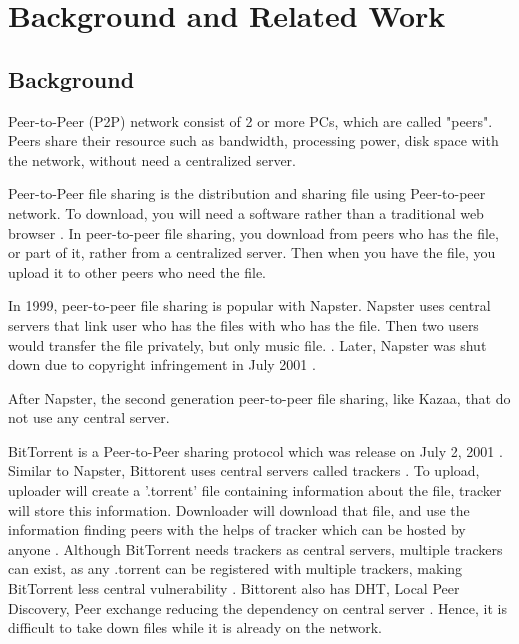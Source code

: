 \documentclass[conference]{IEEEtran}
\begin{document}
\section{Background and Related Work} \label{background}
\subsection{Background}
Peer-to-Peer (P2P) network consist of 2 or more PCs, which are called "peers". Peers share their resource such as bandwidth, processing power, disk space with the network, without need a centralized server. \cite{schollmeier2001definition}

Peer-to-Peer file sharing is the distribution and sharing file using Peer-to-peer network. To download, you will need a software rather than a traditional web browser \cite{HowBitTorrentWorks}. In peer-to-peer file sharing, you download from peers who has the file, or part of it, rather from a centralized server. Then when you have the file, you upload it to other peers who need the file. \cite{HowP2PWorks}

In 1999, peer-to-peer file sharing is popular with Napster. Napster uses central servers that link user who has the files with who has the file. Then two users would transfer the file privately, but only music file. \cite{tyson2005old}. Later, Napster was shut down due to copyright infringement in July 2001 \cite{douglas2004copyright}.

After Napster, the second generation peer-to-peer file sharing, like Kazaa, that do not use any central server. \cite{watson2008kazaa}  


BitTorrent is a Peer-to-Peer sharing protocol which was release on July 2, 2001 \cite{cohen2001BitTorrent}. Similar to Napster, Bittorent uses central servers called trackers \cite{HowP2PWorks}. To upload, uploader will create a '.torrent' file containing information about the file, tracker will store this information. Downloader will download that file, and use the information finding peers with the helps of tracker which can be hosted by anyone \cite{HowP2PWorks}. Although BitTorrent needs trackers as central servers, multiple trackers can exist, as any .torrent can be registered with multiple trackers, making BitTorrent less central vulnerability \cite{HowP2PWorks}. Bittorent also has DHT, Local Peer Discovery, Peer exchange reducing the dependency on central server \cite{bittorentdhtpex}. Hence, it is difficult to take down files while it is already on the network.   
\end{document}
